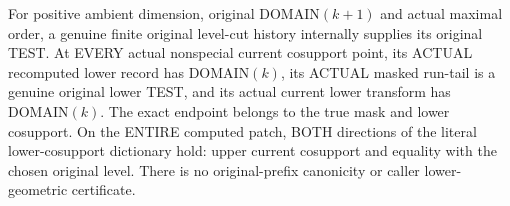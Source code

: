 \begin{theorem}
\label{hir:original-finite-level-cut-current-lower-tests}
\leanok
For positive ambient dimension, original DOMAIN$(k+1)$ and actual maximal
order, a genuine finite original level-cut history internally supplies
its original TEST. At EVERY actual nonspecial current cosupport point,
its ACTUAL recomputed lower record has DOMAIN$(k)$, its ACTUAL masked
run-tail is a genuine original lower TEST, and its actual current lower
transform has DOMAIN$(k)$. The exact endpoint belongs to the true mask
and lower cosupport. On the ENTIRE computed patch, BOTH directions of
the literal lower-cosupport dictionary hold: upper current cosupport and
equality with the chosen original level. There is no original-prefix
canonicity or caller lower-geometric certificate.
\end{theorem}
